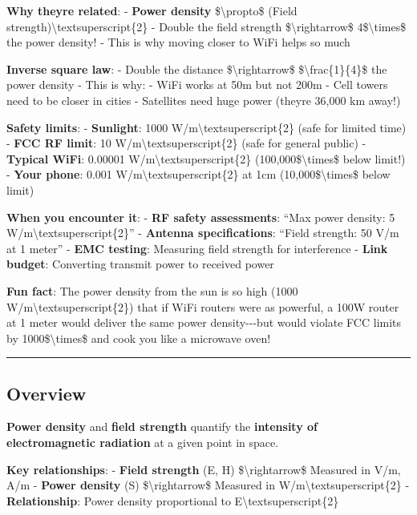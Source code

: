 \textbf{Why they\textquotesingle re related}: - \textbf{Power density}
\$\textbackslash propto\$ (Field
strength)\textbackslash textsuperscript\{2\} - Double the field strength
\$\textbackslash rightarrow\$ 4\$\textbackslash times\$ the power
density! - This is why moving closer to WiFi helps so much

\textbf{Inverse square law}: - Double the distance
\$\textbackslash rightarrow\$ \$\textbackslash frac\{1\}\{4\}\$ the
power density - This is why: - WiFi works at 50m but not 200m - Cell
towers need to be closer in cities - Satellites need huge power
(they\textquotesingle re 36,000 km away!)

\textbf{Safety limits}: - \textbf{Sunlight}: 1000
W/m\textbackslash textsuperscript\{2\} (safe for limited time) -
\textbf{FCC RF limit}: 10 W/m\textbackslash textsuperscript\{2\} (safe
for general public) - \textbf{Typical WiFi}: 0.00001
W/m\textbackslash textsuperscript\{2\} (100,000\$\textbackslash times\$
below limit!) - \textbf{Your phone}: 0.001
W/m\textbackslash textsuperscript\{2\} at 1cm
(10,000\$\textbackslash times\$ below limit)

\textbf{When you encounter it}: - \textbf{RF safety assessments}: ``Max
power density: 5 W/m\textbackslash textsuperscript\{2\}'' -
\textbf{Antenna specifications}: ``Field strength: 50 V/m at 1 meter'' -
\textbf{EMC testing}: Measuring field strength for interference -
\textbf{Link budget}: Converting transmit power to received power

\textbf{Fun fact}: The power density from the sun is so high (1000
W/m\textbackslash textsuperscript\{2\}) that if WiFi routers were as
powerful, a 100W router at 1 meter would deliver the same power
density-\/-\/-but would violate FCC limits by
1000\$\textbackslash times\$ and cook you like a microwave oven!

\begin{center}\rule{0.5\linewidth}{0.5pt}\end{center}

\subsection{Overview}\label{overview}

\textbf{Power density} and \textbf{field strength} quantify the
\textbf{intensity of electromagnetic radiation} at a given point in
space.

\textbf{Key relationships}: - \textbf{Field strength} (E, H)
\$\textbackslash rightarrow\$ Measured in V/m, A/m - \textbf{Power
density} (S) \$\textbackslash rightarrow\$ Measured in
W/m\textbackslash textsuperscript\{2\} - \textbf{Relationship}: Power
density proportional to E\textbackslash textsuperscript\{2\}

